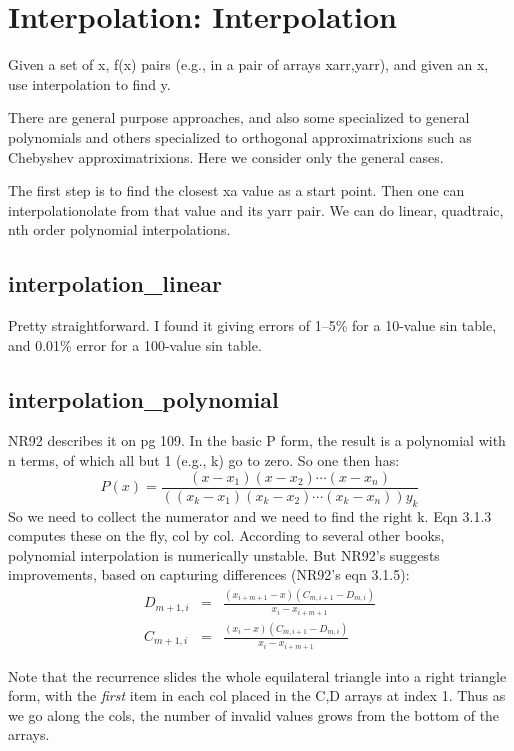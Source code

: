 \section{Interpolation: Interpolation}
Given a set of x, f(x) pairs (e.g., in a pair of arrays
xarr,yarr), and given an x, use interpolation to find y.

There are general purpose approaches, and also some
specialized to general polynomials and others specialized to 
orthogonal approximatrixions
such as Chebyshev approximatrixions.  Here we consider only the
general cases.

The first step is to find the closest xa value as a start
point.  Then one can interpolationolate from that value and its
yarr pair.  We can do linear, quadtraic, nth order
polynomial interpolations.

\subsection*{interpolation\_linear}
Pretty straightforward.  I found it giving errors of 1--5\%
for a 10-value sin table, and 0.01\% error for a 100-value
sin table.

\subsection*{interpolation\_polynomial}
NR92 describes it on pg 109.  In the basic P form, the
result is a polynomial with n terms, of which all but 1
(e.g., k) go to zero.  So one then has:
\begin{equation}
     P(x)=\frac{(x-x_1)(x-x_2) \cdots (x-x_n)}
                 {((x_k-x_1)(x_k-x_2) \cdots (x_k-x_n))y_k}
\end{equation}
So we need to collect the numerator and we need to find the
right k.  Eqn 3.1.3 computes these on the fly, col by col.
According to several other books, polynomial interpolation
is numerically unstable.  But NR92's suggests improvements, based on
capturing differences (NR92's eqn 3.1.5):
\begin{eqnarray}
  D_{m+1,i} & = & \frac{(x_{i+m+1}-x)(C_{m,i+1}-D_{m,i})}{x_i-x_{i+m+1}}\\
  C_{m+1,i} & = & \frac{(x_{i}    -x)(C_{m,i+1}-D_{m,i})}{x_i-x_{i+m+1}}
\end{eqnarray}


Note that the recurrence
slides the whole equilateral triangle into a right triangle
form, with the {\em first} item in each col placed in the C,D
arrays at index 1.  Thus as we go along the cols, the number
of invalid values grows from the bottom of the arrays.

